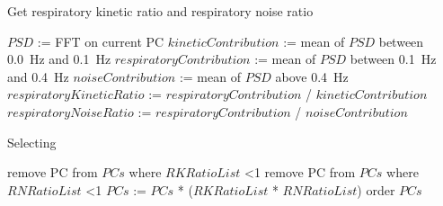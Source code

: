                     \begin{algorithm}
                        \caption{Get respiratory kinetic ratio and respiratory noise ratio}
                        \;
                        $PSD$ := \gls{FFT} on current \gls{PC}\;
                        \;
                        $kineticContribution$ := mean of $PSD$ between \SI{0.0}{\hertz} and \SI{0.1}{\hertz}\;
                        $respiratoryContribution$ := mean of $PSD$ between \SI{0.1}{\hertz} and \SI{0.4}{\hertz}\;
                        $noiseContribution$ := mean of $PSD$ above \SI{0.4}{\hertz}\;
                        \;
                        $respiratoryKineticRatio$ := $respiratoryContribution$ / $kineticContribution$\;
                        $respiratoryNoiseRatio$ := $respiratoryContribution$ / $noiseContribution$\;
                        \;
                    \end{algorithm} \label{eq:pca_data_driven_surrogate_signal_extraction_methods_for_dynamic_pet_methods_selecting_and_combining_pcs_get respiratory_kinetic_ratio_and_respiratory_noise_ratio_pseudo_code}
                    
                    \begin{algorithm}
                        \caption{Selecting }
                        \;
                        \;
                        remove \gls{PC} from $PCs$ where $RKRatioList$ \textless 1\;
                        remove \gls{PC} from $PCs$ where $RNRatioList$ \textless 1\;
                        \;
                        $PCs$ := $PCs$ * ($RKRatioList$ * $RNRatioList$)\;
                        order $PCs$\;
                    \end{algorithm} \label{eq:pca_data_driven_surrogate_signal_extraction_methods_for_dynamic_pet_methods_selecting_pcs_pseudo_code}
                    
